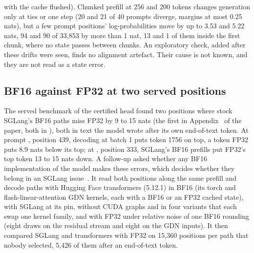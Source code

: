 with the cache flushed). Chunked prefill at 256 and 200 tokens changes generation only at ties or one step (20 and 21 of 40 prompts diverge, margins at most 0.25 nats), but a few prompt positions' log-probabilities move by up to 3.53 and 5.22 nats, 94 and 90 of 33,853 by more than 1 nat, 13 and 1 of them inside the first chunk, where no state passes between chunks. An exploratory check, added after these drifts were seen, finds no alignment artefact. Their cause is not known, and they are not read as a state error.

\subsection{BF16 against FP32 at two served positions}\label{notes:bf16}
The served benchmark of the certified head found two positions where stock SGLang's BF16 paths miss FP32 by 9 to 15 nats (the first in Appendix~ of the paper, both in ), both in text the model wrote after its own end-of-text token. At prompt , position 439, decoding at batch 1 puts token 1756 on top, a token FP32 puts 8.9 nats below its top; at , position 333, SGLang's BF16 prefills put FP32's top token 13 to 15 nats down. A follow-up asked whether any BF16 implementation of the model makes these errors, which decides whether they belong in an SGLang issue~. It read both positions along the same prefill and decode paths with Hugging Face transformers (5.12.1) in BF16 (its torch and flash-linear-attention GDN kernels, each with a BF16 or an FP32 cached state), with SGLang at its pin, without CUDA graphs and in four variants that each swap one kernel family, and with FP32 under relative noise of one BF16 rounding (eight draws on the residual stream and eight on the GDN inputs). It then compared SGLang and transformers with FP32 on 15,360 positions per path that nobody selected, 5,426 of them after an end-of-text token.

